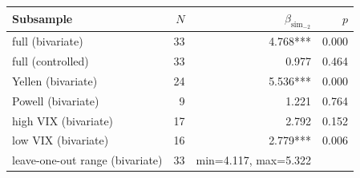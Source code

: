 \begin{tabular}{lrrr}
\toprule
Subsample & $N$ & $\hat\beta_{\mathrm{sim}_{-2}}$ & $p$ \\
\midrule
full (bivariate) & 33 & 4.768*** & 0.000 \\
full (controlled) & 33 & 0.977 & 0.464 \\
Yellen (bivariate) & 24 & 5.536*** & 0.000 \\
Powell (bivariate) & 9 & 1.221 & 0.764 \\
high VIX (bivariate) & 17 & 2.792 & 0.152 \\
low VIX (bivariate) & 16 & 2.779*** & 0.006 \\
leave-one-out range (bivariate) & 33 & min=4.117, max=5.322 & \\
\bottomrule
\end{tabular}